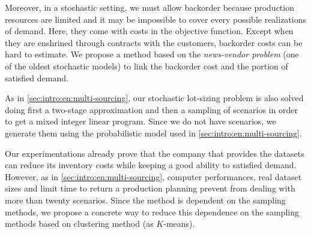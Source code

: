 Moreover, in a stochastic setting, we must allow backorder because production resources are limited and it may be impossible to cover every possible realizations of demand.
Here, they come with costs in the objective function.
Except when they are enshrined through contracts with the customers, backorder costs can be hard to estimate.
We propose a method based on the \emph{news-vendor problem} (one of the oldest stochastic models) to link the backorder cost and the portion of satisfied demand.


As in \cref{sec:intro:en:multi-sourcing}, our stochastic lot-sizing problem is also solved doing first a two-stage approximation and then a sampling of scenarios in order to get a mixed integer linear program.
Since we do not have scenarios, we generate them using the probabilistic model used in \cref{sec:intro:en:multi-sourcing}.


\medskip


Our experimentations already prove that the company that provides the datasets can reduce its inventory costs while keeping a good ability to satisfied demand.
However, as in \cref{sec:intro:en:multi-sourcing}, computer performances, real dataset sizes and limit time to return a production planning prevent from dealing with more than twenty scenarios.
Since the method is dependent on the sampling methods, we propose a concrete way to reduce this dependence on the sampling methods based on clustering method (as $K$-means).


